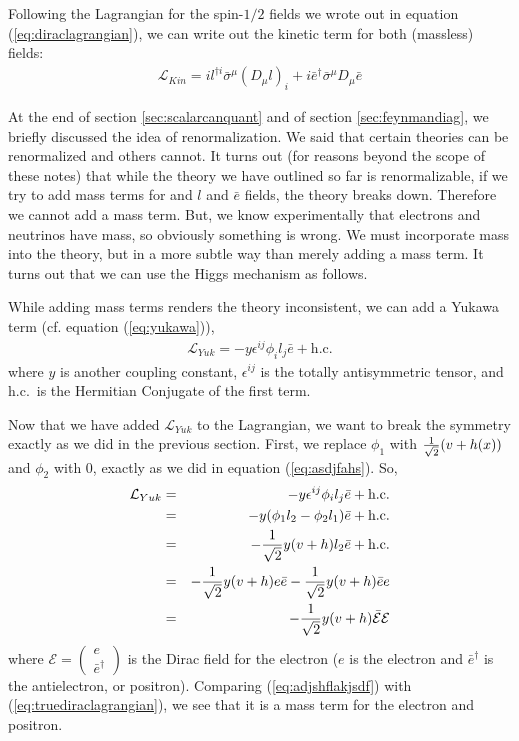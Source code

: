 \documentclass[12pt,epsf]{article}
\def\nolabel{\nonumber }
\def\nolabel{\nonumber }
\begin{document}
Following the Lagrangian for the spin-$1/2$ fields we wrote out in
equation (\ref{eq:diraclagrangian}), we can write out the kinetic term
for both (massless) fields:
\begin{eqnarray}
\mathcal{L}_{Kin} = il^{\dagger i} \bar \sigma^{\mu}(D_{\mu}l)_i + i
\bar e^{\dagger}\bar \sigma^{\mu}D_{\mu}\bar e
\label{eq:iouwertoipuwertoipuerwt}
\end{eqnarray}

At the end of section \ref{sec:scalarcanquant} and of section
\ref{sec:feynmandiag}, we briefly discussed the idea of
renormalization.  We said that certain theories can be renormalized and
others cannot.	It turns out (for reasons beyond the scope of these
notes) that while the theory we have outlined so far is renormalizable,
if we try to add mass terms for and $l$ and $\bar e$ fields, the theory
breaks down.  Therefore we cannot add a mass term.  But, we know
experimentally that electrons and neutrinos have mass, so obviously
something is wrong.  We must incorporate mass into the theory, but in a
more subtle way than merely adding a mass term.  It turns out that we
can use the Higgs mechanism as follows.  

While adding mass terms renders the theory inconsistent, we can add a
Yukawa term (cf. equation (\ref{eq:yukawa})),
\begin{eqnarray}
\mathcal{L}_{Yuk} = -y \epsilon^{ij}\phi_i l_j \bar e + \mbox{h.c.}\nolabel
\end{eqnarray}
where $y$ is another coupling constant, $\epsilon^{ij}$ is the totally
antisymmetric tensor, and h.c.~is the Hermitian Conjugate of the
first term.  

Now that we have added $\mathcal{L}_{Yuk}$ to the Lagrangian, we want
to break the symmetry exactly as we did in the previous section. 
First, we replace $\phi_1$ with ${1\over \sqrt{2}}(v+h(x))$ and
$\phi_2$ with 0, exactly as we did in equation (\ref{eq:asdjfahs}). 
So, 
\begin{eqnarray}
\mathcal{L}_{Yuk} &=& -y\epsilon^{ij}\phi_il_j\bar e + \mbox{h.c.} \nolabel \\
&=& -y(\phi_1l_2 - \phi_2l_1)\bar e + \mbox{h.c.} \nolabel \\
&=& -{1 \over \sqrt{2}}y(v+h)l_2\bar e + \mbox{h.c.} \nolabel \\
&=& -{1\over \sqrt{2}}y(v+h)e \bar e - {1\over \sqrt{2}}y(v+h)\bar e e
\nolabel \\
&=& -{1\over \sqrt{2}} y (v+h) \mathcal{\bar E} \mathcal{E}
\label{eq:adjshflakjsdf}
\end{eqnarray}
where $\mathcal{E} = \begin{pmatrix} e \\ \bar e^{\dagger}
\end{pmatrix}$ is the Dirac field for the electron ($e$ is the electron
and $\bar e^{\dagger}$ is the antielectron, or positron).  Comparing
(\ref{eq:adjshflakjsdf}) with (\ref{eq:truediraclagrangian}), we see
that it is a mass term for the electron and positron.  
\end{document}
